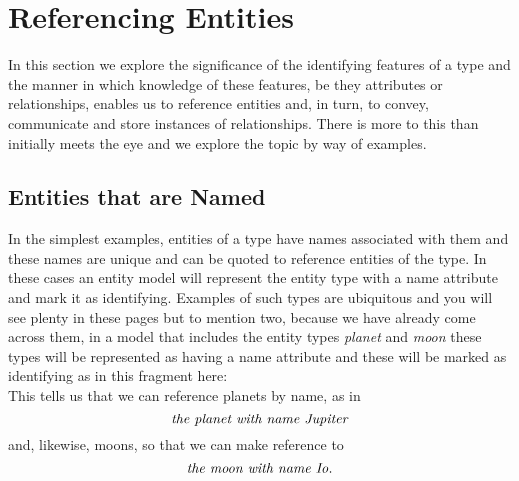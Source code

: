 \section{Referencing Entities}
\label{ReferencingEntities}

In this section we explore the significance of the identifying features
of a type and the manner in which knowledge of these features, 
be they attributes or relationships, enables us to 
reference entities and, in turn, 
to convey, communicate and store instances of relationships. 
There is more to this than initially meets the eye and we explore the topic
by way of examples.  

\subsection{Entities that are Named}
\mynote {}
In the simplest examples, entities of a type have names associated with them
 and these names are unique and can be  quoted to reference entities of the type. 
 In these cases an entity model will represent the entity type with a name attribute
and mark it as identifying. 
Examples of such types are ubiquitous and you will see plenty in these pages but to mention two, because we have already come across them, in a model that includes the 
entity types \textit{planet} and  \textit{moon}  these types will be represented as having 
a name attribute and these will be marked as identifying as in this fragment here:
\begin{equation}
\label{planetMoonModel}

\end{equation}
This tells us that we can reference planets by name, as in 
\begin{equation}
\label{theplanetJupiter}
\mbox{\textit{the planet with name Jupiter}}
\end{equation}
and, likewise, moons, so that we can make reference to 
\begin{equation}
\label{themoonIo}
\mbox{\textit{the moon with name Io}}.
\end{equation}


